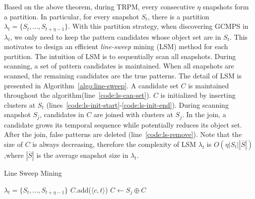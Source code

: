 Based on the above theorem, during TRPM, every consecutive $\eta$ snapshots
form a partition. In particular, for every snapshot $S_t$, there is
a partition $\lambda_t=\{S_t,...,S_{t+\eta-1}\}$. With this partition strategy,
when discovering GCMPS in $\lambda_t$, we only need to keep the pattern candidates whose
object set are in $S_t$. This motivates to design an efficient 
\emph{line-sweep} mining (LSM) method for each partition. The intuition of LSM is 
to sequentially scan all snapshots. During scanning, a set of pattern candidates is maintained.
When all snapshots are scanned, the remaining candidates are the true patterns.
The detail of LSM is presented in Algorithm~\ref{algo:line-sweep}.
A candidate set $C$ is maintained throughout the algorithm(line~\ref{code:ls-can-set}). $C$
is initialized by inserting clusters at $S_t$ (lines~\ref{code:ls-init-start}-\ref{code:ls-init-end}).
During scanning snapshot $S_j$, candidates in $C$ are joined with clusters at $S_j$. In
the join, a candidate grows its temporal sequence while potentially reduces its object set. After the join,
false patterns are deleted (line~\ref{code:ls-remove}). 
Note that the size of $C$ is always decreasing, therefore the complexity of LSM $\lambda_t$ is $O(\eta|S_t||\overline{S}|)$,where $|\overline{S}|$ is the average snapshot size in $\lambda_t$.



\begin{algorithm}
\caption{Line Sweep Mining}
\label{algo:line-sweep}
\begin{algorithmic}[1]
\Require $\lambda_t = \{S_t, ..., S_{t+\eta-1}\}$
  \label{code:ls-can-set}
\label{code:ls-init-start}
\State $C$.add($\langle c, t \rangle $)
\EndFor
\label{code:ls-init-end}
\State $C \gets S_{j} \oplus C$ \label{code:ls-join}
	\label{code:ls-remove}
\EndFor
{}
\end{algorithmic}
\end{algorithm}




